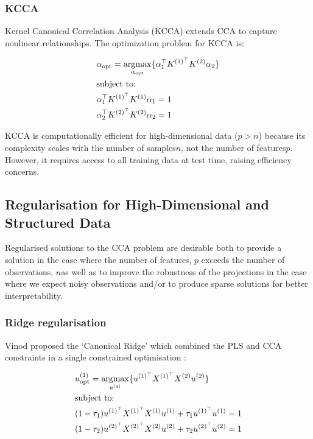 \subsubsection{KCCA}

Kernel Canonical Correlation Analysis (KCCA) extends CCA to capture nonlinear relationships. The optimization problem for KCCA is:

\begin{align}
    & \alpha_{\text{opt}}=\underset{\alpha_{\text{opt}}}{\mathrm{argmax}}\{ \alpha_1^{\top}K^{(1)^{\top}}K^{(2)}\alpha_2  \}\\
    & \text{subject to:} \notag\\
    & \alpha_1^{\top}K^{(1)^{\top}}K^{(1)}\alpha_1=1 \notag\\
    & \alpha_2^{\top}K^{(2)^{\top}}K^{(2)}\alpha_2=1 \notag
\end{align}


KCCA is computationally efficient for high-dimensional data (\(p>n\)) because its complexity scales with the number of samples\(n\), not the number of features\(p\).
However, it requires access to all training data at test time, raising efficiency concerns.

\subsection{Regularisation for High-Dimensional and Structured Data}

Regularised solutions to the CCA problem are desirable both to provide a solution in the case where the number of features, \( p \) exceeds the number of observations, \( n \)as well as to improve the robustness of the projections in the case where we expect noisy observations \cite{branco2005robust} and/or to produce sparse solutions for better interpretability\cite{parkhomenko2009sparse}.

\subsubsection{Ridge regularisation}\label{subsec:ridge-regularisation}

Vinod proposed the `Canonical Ridge' which combined the PLS and CCA constraints in a single constrained optimisation \cite{vinod1976canonical}:

\begin{align}
     & u^{(1)}_{\text{opt}} = \underset{u^{(1)}}{\mathrm{argmax}} \{ u^{(1)^{\top}} X^{(1)^{\top}} X^{(2)} u^{(2)} \} \\
     & \text{subject to:} \notag \\
     & (1 - \tau_1) u^{(1)^{\top}} X^{(1)^{\top}} X^{(1)} u^{(1)} + \tau_1 u^{(1)^{\top}} u^{(1)} = 1 \notag \\
     & (1 - \tau_2) u^{(2)^{\top}} X^{(2)^{\top}} X^{(2)} u^{(2)} + \tau_2 u^{(2)^{\top}} u^{(2)} = 1 \notag
\end{align}

